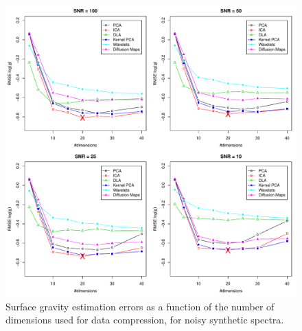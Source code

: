 \documentclass[a4paper,fleqn,usenatbib]{mnras}
\begin{document}
{{{\begin{figure}
\centering\includegraphics[width=\textwidth]{flamesHR10_Logg_log_BestSVM_N-RMSE_test.pdf}
\caption{Surface gravity estimation errors as a function of the number of
  dimensions used for data compression, for noisy synthetic
  spectra.}
\label{fig:04}
\end{figure}


}}}
\end{document}

